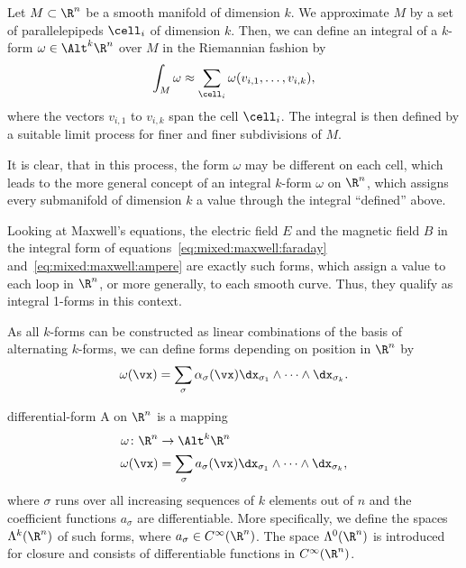 \begin{intro}
  Let $M \subset \R^n$ be a smooth manifold of dimension $k$. We
  approximate $M$ by a set of parallelepipeds $\cell_i$ of dimension
  $k$. Then, we can define an integral of a $k$-form
  $\omega\in \Alt^k\R^n$ over $M$ in the Riemannian fashion by
  \begin{gather}
    \int_M \omega \approx \sum_{\cell_i} \omega(v_{i,1},\dots, v_{i,k}),
  \end{gather}
  where the vectors $v_{i,1}$ to $v_{i,k}$ span the cell
  $\cell_i$. The integral is then defined by a suitable limit process
  for finer and finer subdivisions of $M$.

  It is clear, that in this process, the form $\omega$ may be
  different on each cell, which leads to the more general concept of
  an integral $k$-form $\omega$ on $\R^n$, which assigns every
  submanifold of dimension $k$ a value through the integral
  ``defined'' above.

  Looking at Maxwell's equations, the electric field $E$ and the
  magnetic field $B$ in the integral form of
  equations~\eqref{eq:mixed:maxwell:faraday}
  and~\eqref{eq:mixed:maxwell:ampere} are exactly such forms, which
  assign a value to each loop in $\R^n$, or more generally, to each
  smooth curve. Thus, they qualify as integral 1-forms in this
  context.

  As all $k$-forms can be constructed as linear combinations of the
  basis of alternating $k$-forms, we can define forms depending on
  position in $\R^n$ by
  \begin{gather}
    \omega(\vx) = \sum_{\sigma} \alpha_{\sigma}(\vx)
    \dx_{\sigma_1}\wedge\dots\wedge \dx_{\sigma_k}.
  \end{gather}
\end{intro}

\begin{Definition}{differential-form}
  A  on $\R^n$ is a mapping
  \begin{gather}
    \begin{split}
      \omega\colon \R^n &\to  \Alt^k\R^n\\
      \omega(\vx) &= \sum_{\sigma} a_{\sigma}(\vx)
      \dx_{\sigma_1}\wedge\dots\wedge \dx_{\sigma_k},
    \end{split}
  \end{gather}
  where $\sigma$ runs over all increasing sequences of $k$ elements
  out of $n$ and the coefficient functions $a_\sigma$ are
  differentiable. More specifically, we define the spaces
  $\Lambda^k(\R^n)$ of such forms, where
  $a_\sigma \in C^\infty(\R^n)$.
  The space $\Lambda^0(\R^n)$ is introduced for closure and
  consists of differentiable functions in $C^\infty(\R^n)$.
\end{Definition}

